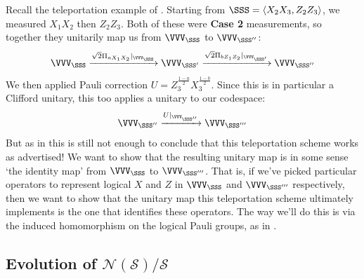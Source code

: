 \begin{example}\label{ex:teleportation_codespace_updates}
    Recall the teleportation example of .
    Starting from $\SSS = \langle X_2 X_3, Z_2 Z_3 \rangle$, we measured $X_1 X_2$ then $Z_2 Z_3$.
    Both of these were \textbf{Case 2} measurements, so together they unitarily map us from $\VVV_\SSS$ to $\VVV_{\SSS''}$:
    \begin{equation}
        \VVV_{\SSS}
        \xrightarrow{\sqrt{2}\Pi_{a X_1 X_2}|_{\VVV_{\SSS}}}
        \VVV_{\SSS'}
        \xrightarrow{\sqrt{2}\Pi_{b Z_1 Z_2}|_{\VVV_{\SSS'}}}
        \VVV_{\SSS''}
    \end{equation}
    We then applied Pauli correction $U = Z_3^{\frac{1 - a}{2}} X_3^{\frac{1 - b}{2}}$.
    Since this is in particular a Clifford unitary, this too applies a unitary to our codespace:
    \begin{equation}
        \VVV_{\SSS''}
        \xrightarrow{U|_{\VVV_{\SSS''}}}
        \VVV_{\SSS'''}
    \end{equation}
    But as in  this is still not enough to conclude that this teleportation scheme works as advertised!
    We want to show that the resulting unitary map is in some sense `the identity map' from $\VVV_{\SSS}$ to $\VVV_{\SSS'''}$.
    That is, if we've picked particular operators to represent logical $X$ and $Z$ in $\VVV_{\SSS}$ and $\VVV_{\SSS'''}$ respectively, then we want to show that the unitary map this teleportation scheme ultimately implements is the one that identifies these operators.
    The way we'll do this is via the induced homomorphism on the logical Pauli groups, as in .
\end{example}

\subsection{Evolution of $\mathcal{N}(\mathcal{S})/\mathcal{S}$}\label{subsec:evolution_of_logical_pauli_group}

